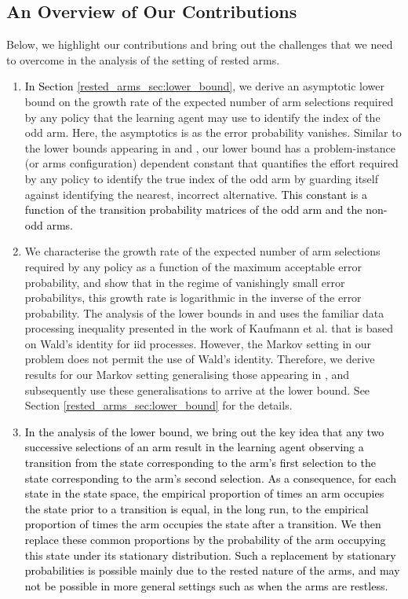 \subsection{An Overview of Our Contributions}
Below, we highlight our contributions and bring out the challenges that we need to overcome in the analysis of the setting of rested arms.
\begin{enumerate}
    \item \textcolor{black}{In Section \ref{rested_arms_sec:lower_bound}}, we derive an asymptotic lower bound on {\color{black} the growth rate of} the expected number of arm selections required by any policy that the learning agent may use to identify the index of the odd arm. Here, the asymptotics is as the error probability vanishes. Similar to the lower bounds appearing in \cite{prabhu2017learning} and \cite{agrawal1989asymptotically}, our lower bound has a problem-instance (or arms configuration) dependent constant that quantifies the effort required by any policy to identify the true index of the odd arm by guarding itself against identifying the nearest, incorrect alternative. \textcolor{black}{This constant is a function of the transition probability matrices of the odd arm and the non-odd arms.}
    \item We characterise the growth rate of the expected number of arm selections required by any policy as a function of the maximum acceptable error probability, and show that in the regime of vanishingly small error probabilitys, this growth rate is logarithmic in the inverse of the error probability. The analysis of the lower bounds in \cite{vaidhiyan2017learning} and \cite{prabhu2017learning} uses the familiar data processing inequality presented in the work of Kaufmann et al. \cite{kaufmann2016complexity} that is based on Wald's identity \cite{wald1944cumulative} for iid processes. However, the Markov setting in our problem does not permit the use of Wald's identity. Therefore, we derive results for our Markov setting generalising those appearing in \cite{kaufmann2016complexity}, and subsequently use these generalisations to arrive at the lower bound. See Section \ref{rested_arms_sec:lower_bound} for the details.
    \item \textcolor{black}{In the analysis of the lower bound, we bring out the key idea that any two successive selections of an arm result in the learning agent observing a transition from the state corresponding to the arm's first selection to the state corresponding to the arm's second selection. As a consequence, for each state in the state space, the empirical proportion of times an arm occupies the state prior to a transition is equal, in the long run, to the empirical proportion of times the arm occupies the state after a transition. We then replace these common proportions by the probability of the arm occupying this state under its stationary distribution. Such a replacement by stationary probabilities is possible mainly due to the rested nature of the arms, and may not be possible in more general settings such as when the arms are restless.}

\end{enumerate}
